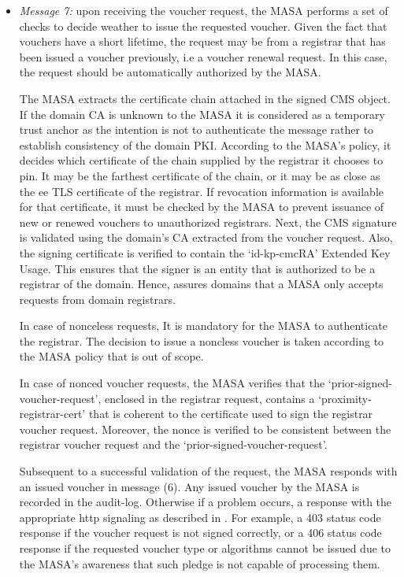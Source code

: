 \begin{itemize}
	\item \textit{Message 7:} upon receiving the voucher request, the MASA performs a set of checks to decide weather to issue the requested voucher. Given the fact that vouchers have a short lifetime, the request may be from a registrar that has been issued a voucher previously, i.e a voucher renewal request. In this case, the request should be automatically authorized by the MASA.
	\par
	 The MASA extracts the certificate chain attached in the signed CMS object. If the domain CA is unknown to the MASA it is considered as a temporary trust anchor as the intention is not to authenticate the message rather to establish consistency of the domain PKI. According to the MASA's policy, it decides which certificate of the chain supplied by the registrar it chooses to pin. It may be the farthest certificate of the chain, or it may be as close as the \gls{ee} TLS certificate of the registrar. If revocation information is available for that certificate, it must be checked by the MASA to prevent issuance of new or renewed vouchers to unauthorized registrars. Next, the CMS signature is validated using the domain's CA extracted from the voucher request. Also, the signing certificate is verified to contain the `id-kp-cmcRA' Extended Key Usage. This ensures that the signer is an entity that is authorized to be a registrar of the domain. Hence, assures domains that a MASA only accepts requests from domain registrars. 
	 \par
	 In case of nonceless requests, It is mandatory for the MASA to authenticate the registrar. The decision to issue a noncless voucher is taken according to the MASA policy that is out of scope.
	 \par 
	 In case of nonced voucher requests, the MASA verifies that the `prior-signed-voucher-request', enclosed in the registrar request, contains a `proximity-registrar-cert' that is coherent to the certificate used to sign the registrar voucher request. Moreover, the nonce is verified to be consistent between the registrar voucher request and the `prior-signed-voucher-request'.
	 \par
	 Subsequent to a successful validation of the request, the MASA responds with an issued voucher in message (6). Any issued voucher by the MASA is recorded in the audit-log. Otherwise if a problem occurs, a response with the appropriate http signaling as described in \cite{brski}. For example, a 403 status code response if the voucher request is not signed correctly, or a 406 status code response if the requested voucher type or algorithms cannot be issued due to the MASA's awareness that such pledge is not capable of processing them.
	 

\end{itemize}
